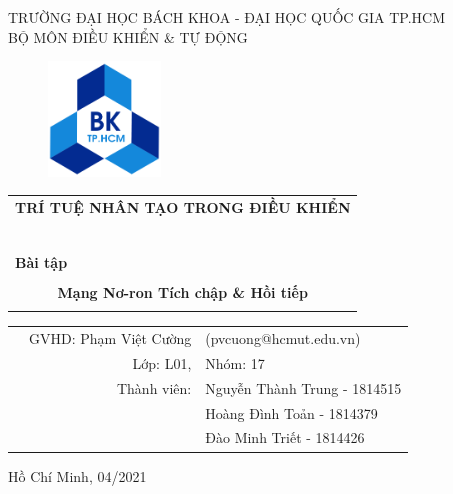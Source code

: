 \documentclass[a4paper]{article}
\begin{document}
\begin{titlepage}

\begin{center}
TRƯỜNG ĐẠI HỌC BÁCH KHOA - ĐẠI HỌC QUỐC GIA TP.HCM\\
BỘ MÔN ĐIỀU KHIỂN \& TỰ ĐỘNG
\end{center}

\vspace{1cm}

\begin{figure}[h!]
\begin{center}
\includegraphics[width=3cm]{hcmut.png}
\end{center}
\end{figure}

\vspace{1cm}


\begin{center}
\begin{tabular}{c}
\multicolumn{1}{l}{\textbf{{\Large TRÍ TUỆ NHÂN TẠO TRONG ĐIỀU KHIỂN}}}\\
~~\\
\hline
\\
\multicolumn{1}{l}{\textbf{{\Large Bài tập}}}\\
\\
\textbf{\Huge Mạng Nơ-ron Tích chập \& Hồi tiếp}\\
\\
\hline
\end{tabular}
\end{center}

\vspace{3cm}

\begin{table}[h]
\begin{tabular}{rrl}

\hspace{5 cm} & GVHD: Phạm Việt Cường & (pvcuong@hcmut.edu.vn)\\
& Lớp: L01, & Nhóm: 17\\
& Thành viên: & Nguyễn Thành Trung - 1814515 \\
& & Hoàng Đình Toản - 1814379\\
& & Đào Minh Triết - 1814426

\end{tabular}
\end{table}

\begin{center}
{\footnotesize Hồ Chí Minh, 04/2021}
\end{center}
\end{titlepage}
\end{document}
